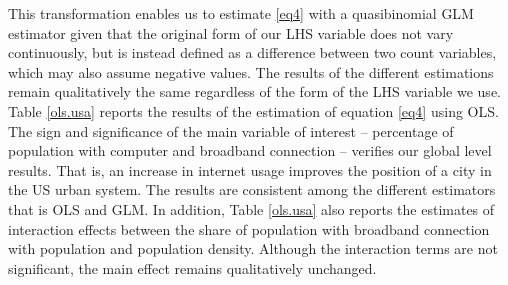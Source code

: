 \documentclass[10pt,letterpaper]{article}
\begin{document}
This transformation enables us to estimate \ref{eq4} with a
quasibinomial GLM estimator given that the original form of our LHS
variable does not vary continuously, but is instead defined as a
difference between two count variables, which may also assume negative
values. The results of the different estimations remain qualitatively
the same regardless of the form of the LHS variable we use. Table
\ref{ols.usa} reports the results of the estimation of equation
\ref{eq4} using OLS. The sign and significance of the main variable of
interest -- percentage of population with computer and broadband
connection -- verifies our global level results. That is, an increase in
internet usage improves the position of a city in the US urban system.
The results are consistent among the different estimators that is OLS
and GLM. In addition, Table \ref{ols.usa} also reports the estimates of
interaction effects between the share of population with broadband
connection with population and population density. Although the
interaction terms are not significant, the main effect remains
qualitatively unchanged.
\end{document}
